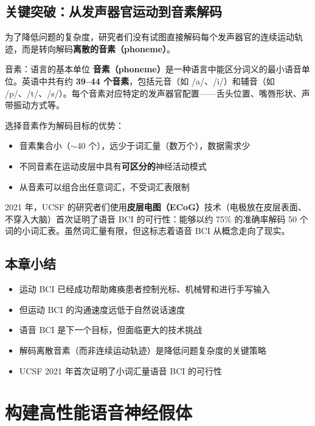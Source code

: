 \documentclass[a4paper]{article}
\begin{document}
\subsection{关键突破：从发声器官运动到音素解码}

为了降低问题的复杂度，研究者们没有试图直接解码每个发声器官的连续运动轨迹，而是转向解码\textbf{离散的音素（phoneme）}。

\begin{knowledgebox}{音素：语言的基本单位}
\textbf{音素（phoneme）}是一种语言中能区分词义的最小语音单位。英语中共有约 \textbf{39--44 个音素}，包括元音（如 /a/、/i/）和辅音（如 /p/、/t/、/s/）。每个音素对应特定的发声器官配置——舌头位置、嘴唇形状、声带振动方式等。

选择音素作为解码目标的优势：
\begin{itemize}
    \item 音素集合小（$\sim$40 个），远少于词汇量（数万个），数据需求少
    \item 不同音素在运动皮层中具有\textbf{可区分的}神经活动模式
    \item 从音素可以组合出任意词汇，不受词汇表限制
\end{itemize}
\end{knowledgebox}

2021 年，UCSF 的研究者们使用\textbf{皮层电图（ECoG）}技术（电极放在皮层表面、不穿入大脑）首次证明了语音 BCI 的可行性：能够以约 75\% 的准确率解码 50 个词的小词汇表。虽然词汇量有限，但这标志着语音 BCI 从概念走向了现实。

\subsection{本章小结}

\begin{itemize}
    \item 运动 BCI 已经成功帮助瘫痪患者控制光标、机械臂和进行手写输入
    \item 但运动 BCI 的沟通速度远低于自然说话速度
    \item 语音 BCI 是下一个目标，但面临更大的技术挑战
    \item 解码离散音素（而非连续运动轨迹）是降低问题复杂度的关键策略
    \item UCSF 2021 年首次证明了小词汇量语音 BCI 的可行性
\end{itemize}


\section{构建高性能语音神经假体}
\end{document}
